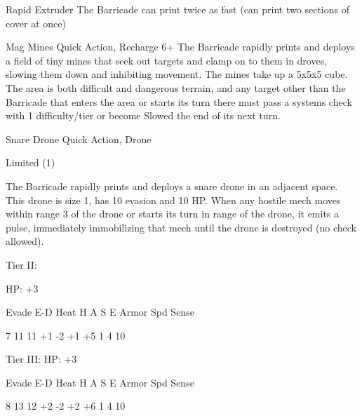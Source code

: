 Rapid Extruder
The Barricade can print twice as fast (can print two sections of cover at once)


Mag Mines
Quick Action, Recharge 6+
The Barricade rapidly prints and deploys a field of tiny mines that seek out targets and clamp on
to them in droves, slowing them down and inhibiting movement. The mines take up a 5x5x5
cube. The area is both difficult and dangerous terrain, and any target other than the Barricade
that enters the area or starts its turn there must pass a systems check with 1 difficulty/tier or
become Slowed the end of its next turn.


Snare Drone
Quick Action, Drone

Limited (1)

The Barricade rapidly prints and deploys a snare drone in an adjacent space. This drone is size
1, has 10 evasion and 10 HP. When any hostile mech moves within range 3 of the drone or starts
its turn in range of the drone, it emits a pulse, immediately immobilizing that mech until the drone
is destroyed (no check allowed).


Tier II:

HP: +3


          Evade     E-D    Heat    H    A     S     E       Armor        Spd       Sense

          7         11     11      +1   -2    +1    +5      1            4         10

Tier III:
HP: +3


          Evade     E-D    Heat    H    A     S     E       Armor        Spd       Sense

          8         13     12      +2   -2    +2    +6      1            4         10
